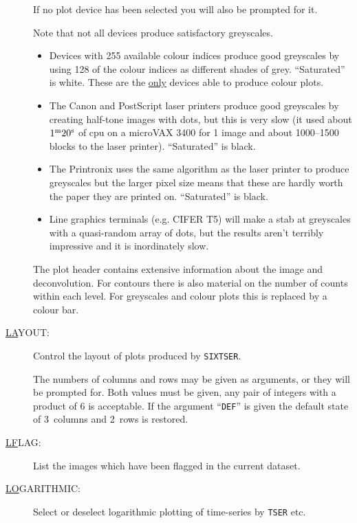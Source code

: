 \begin{description}
If no plot device has been selected you will also be prompted for it.

Note that not all devices produce satisfactory greyscales.
\begin{itemize}
\item Devices with 255 available colour indices produce good greyscales by
using 128 of the colour indices as different shades of grey.
``Saturated'' is white.  These are the \underline{only} devices able to
produce colour plots.

\item The Canon and PostScript laser printers produce good greyscales by
creating half-tone images with dots, but this is very slow (it used
about $1^{\rm m}20^{\rm s}$ of cpu on a microVAX 3400 for 1 image and
about 1000--1500 blocks to the laser printer). ``Saturated'' is black.

\item The Printronix uses the same
algorithm as the laser printer to produce greyscales but the larger
pixel size means that these are hardly worth the paper they are printed
on.  ``Saturated'' is black.

\item Line graphics terminals (e.g. CIFER T5) will make a stab at
greyscales with a quasi-random array of dots, but the results aren't
terribly impressive and it is inordinately slow.

\end{itemize}

The plot header contains extensive information about the image and
deconvolution. For contours there is also material on the number of
counts within each level.  For greyscales and colour plots this is
replaced by a colour bar.

\item[\underline{LA}YOUT: ] \label{la}
Control the layout of plots produced by {\tt SIXTSER}.

The numbers of columns and rows may be given as arguments, or they will
be prompted for. Both values must be given, any pair of integers with a
product of 6 is acceptable. If the argument ``{\tt DEF}'' is given the
default state of 3~columns and 2~rows is restored.

\item[\underline{LF}LAG: ] \label{lf}
List the images which have been flagged in the current dataset.

\item[\underline{LO}GARITHMIC: ] \label{lo}
Select or deselect logarithmic plotting of time-series by {\tt TSER}
etc.


\end{description}
